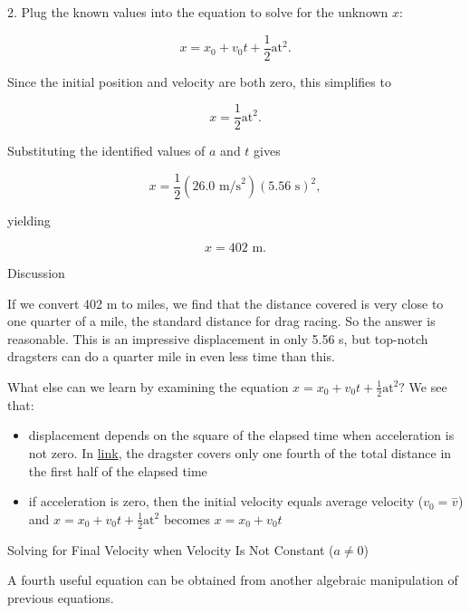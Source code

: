 \documentclass[
]{book}
\providecommand{\tightlist}{%
  \setlength{\itemsep}{0pt}\setlength{\parskip}{0pt}}
\begin{document}
2. Plug the known values into the equation to solve for the unknown
\(x{}\):

\leavevmode{}%
\[{{x = {x_{0} + v_{0}}}{t + \frac{1}{2}}\text{at}^{2}\text{.}}{}\]

Since the initial position and velocity are both zero, this simplifies
to

\leavevmode{}%
\[{{x = \frac{1}{2}}\text{at}^{2}\text{.}}{}\]

Substituting the identified values of \(a{}\) and \(t{}\) gives

\leavevmode{}%
\[{{x = \frac{1}{2}}\left( {\text{26}\text{.}\text{0\ m/s}^{2}} \right)\left( {5\text{.}\text{56\ s}} \right)^{2},}{}\]

yielding

\leavevmode{}%
\[{x = \text{402\ m.}}{}\]

{Discussion}

If we convert 402 m to miles, we find that the distance covered is very
close to one quarter of a mile, the standard distance for drag racing.
So the answer is reasonable. This is an impressive displacement in only
5.56 s, but top-notch dragsters can do a quarter mile in even less time
than this.

What else can we learn by examining the equation
\({{x = {x_{0} + v_{0}}}{t + \frac{1}{2}}\text{at}^{2}}?\) We see that:

\begin{itemize}
\tightlist
\item
  \protect\hypertarget{import-auto-id2166810}{}{displacement depends on the square of the elapsed time when
  acceleration is not zero. In
  \protect\hyperlink{fs-id1164906457202}{link}, the dragster
  covers only one fourth of the total distance in the first half of
  the elapsed time}
\item
  \protect\hypertarget{import-auto-id2167534}{}{if acceleration is zero, then the initial velocity equals average
  velocity (\({v_{0} = \overset{-}{v}}{}\)) and
  \({{x = {x_{0} + v_{0}}}{t + \frac{1}{2}}\text{at}^{2}}{}\) becomes
  \({{x = {x_{0} + v_{0}}}t}{}\)}
\end{itemize}

\hypertarget{fs-id1164906460433}{}
Solving for Final Velocity when Velocity Is Not Constant (\(a \neq 0\))

A fourth useful equation can be obtained from another algebraic
manipulation of previous equations.
\end{document}
